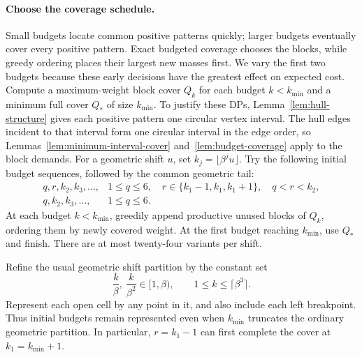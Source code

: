 \paragraph{Choose the coverage schedule.}
Small budgets locate common positive patterns quickly; larger
budgets eventually cover every positive pattern. Exact budgeted
coverage chooses the blocks, while greedy ordering places their
largest new masses first. We vary the first two budgets because
these early decisions have the greatest effect on expected cost.
Compute a maximum-weight block cover $Q_k$ for each budget
$k<k_{\min}$ and a minimum full cover $Q_*$ of size $k_{\min}$.
To justify these DPs, Lemma~\ref{lem:hull-structure} gives each
positive pattern one circular vertex interval. The hull edges
incident to that interval form one circular interval in the edge
order, so Lemmas~\ref{lem:minimum-interval-cover}
and~\ref{lem:budget-coverage} apply to the block demands.
For a geometric shift $u$, set
$k_j=\lfloor\beta^ju\rfloor$. Try the following initial
budget sequences, followed by the common geometric tail:
\[
 \begin{array}{ll}
 q,r,k_2,k_3,\ldots,
 &1\le q\le6,\quad r\in\{k_1-1,k_1,k_1+1\},\quad q<r<k_2,\\
 q,k_2,k_3,\ldots,&1\le q\le6.
 \end{array}
\]
At each budget $k<k_{\min}$, greedily append productive unused
blocks of $Q_k$, ordering them by newly covered weight. At the first
budget reaching $k_{\min}$, use $Q_*$ and finish. There are at most
twenty-four variants per shift.

Refine the usual geometric shift partition by the constant set
\begin{equation}\label{eq:initial-shift-refinement}
 \frac{k}{\beta},\ \frac{k}{\beta^2}\in[1,\beta),
 \qquad 1\le k\le\lceil\beta^3\rceil.
\end{equation}
Represent each open cell by any point in it, and also include each
left breakpoint. Thus initial budgets remain represented even when
$k_{\min}$ truncates the ordinary geometric partition. In particular,
$r=k_1-1$ can first complete the cover at $k_1=k_{\min}+1$.

